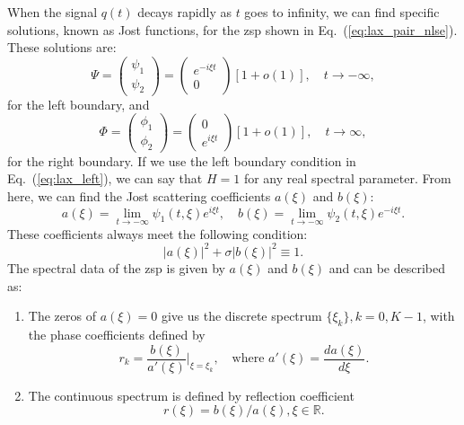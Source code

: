 When the signal \( q(t) \) decays rapidly as \( t \) goes to infinity, we can find specific solutions, known as Jost functions, for the \acrshort{zsp} shown in Eq.~(\ref{eq:lax_pair_nlse}). These solutions are:
\begin{equation}
    \Psi = \begin{pmatrix} \psi_1 \\ \psi_2 \end{pmatrix}
    = \begin{pmatrix} e^{-i \xi t} \\ 0 \end{pmatrix} [1 + o(1)], \quad t \to -\infty,
    \label{eq:lax_left}
\end{equation}
for the left boundary, and
\begin{equation}
    \Phi = \begin{pmatrix} \phi_1 \\ \phi_2 \end{pmatrix} = \begin{pmatrix} 0 \\ e^{i \xi t} \end{pmatrix} [1 + o(1)], \quad t \to \infty,
    \label{eq:lax_right}
\end{equation}
for the right boundary. If we use the left boundary condition in Eq.~(\ref{eq:lax_left}), we can say that \( H = 1 \) for any real spectral parameter. From here, we can find the Jost scattering coefficients \(a(\xi)\) and \(b(\xi)\):
\begin{equation}
    a(\xi) = \lim_{t \to -\infty} \psi_1(t, \xi) e^{i \xi t}, \quad b(\xi) = \lim_{t \to -\infty} \psi_2(t, \xi) e^{-i \xi t}.
    \label{eq:nlse_ab}
\end{equation}
These coefficients always meet the following condition:
\begin{equation}
|a(\xi)|^2 + \sigma|b(\xi)|^2 \equiv 1.
\label{eq:quad_inv}
\end{equation}
The spectral data of the \acrshort{zsp} is given by \(a(\xi)\) and \(b(\xi)\) and can be described as:
\begin{enumerate}
    \item The zeros of \(a(\xi) = 0\) give us the discrete spectrum \(\{\xi_k\}, k = 0, K - 1\),
    with the phase coefficients defined by
    \begin{equation}
        r_k = \frac{b(\xi)}{a'(\xi)} \Bigg|_{\xi=\xi_k}, \quad \text{where } a'(\xi) = \frac{da(\xi)}{d \xi}.
        \label{eq:nlse_rk}
    \end{equation}
    \item The continuous spectrum is defined by reflection coefficient 
    \begin{equation}
        r(\xi) = b(\xi)/a(\xi), \xi \in \mathbb{R} {.}
        \label{eq:nlse_r}
    \end{equation}
\end{enumerate}
